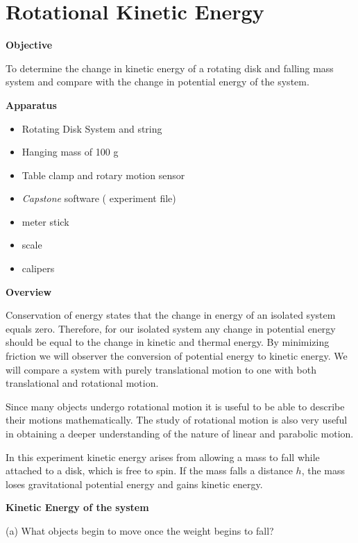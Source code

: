 \section{Rotational Kinetic Energy}

\makelabheader %

\bigskip
\textbf{Objective} 

To determine the change in kinetic energy of a rotating disk and falling mass system and compare with the change in potential energy of the system. 

\bigskip
\textbf{Apparatus}

\begin{itemize}[nosep]
\item Rotating Disk System and string
\item Hanging mass of 100 g  
\item Table clamp and rotary motion sensor
\item \textit{Capstone} software ( experiment file)
\item meter stick
\item scale
\item calipers
\end{itemize}

\bigskip
\textbf{Overview}

Conservation of energy states that the change in energy of an isolated system equals zero. Therefore, for our isolated system any change in potential energy should be equal to the change in kinetic and thermal energy. By minimizing friction we will observer the conversion of potential energy to kinetic energy.  We will compare a system with purely translational motion to one with both translational and rotational motion. 

Since many objects undergo rotational motion it is useful to be able to describe
their motions mathematically. The study of rotational motion is also very useful
in obtaining a deeper understanding of the nature of linear and parabolic motion.

In this experiment kinetic energy arises from allowing a mass to fall while attached to a disk, which is free to spin. If the mass falls a distance $h$, the mass loses gravitational potential energy and gains kinetic energy.   


\textbf{Kinetic Energy of the system} 

(a) What objects begin to move once the weight begins to fall?
\answerspace{7mm}

